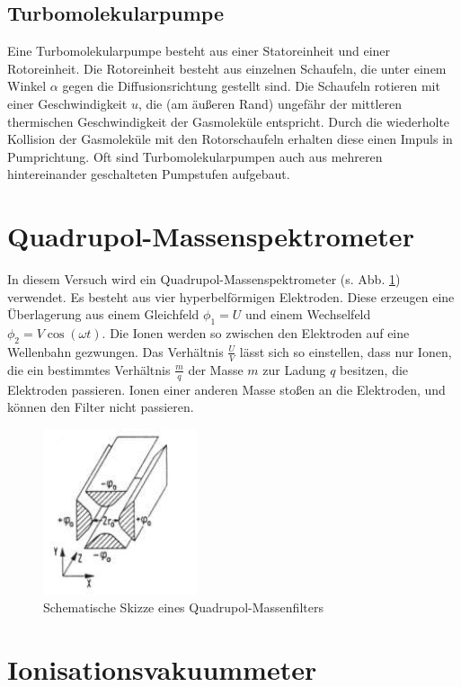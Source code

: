 \subsection{Turbomolekularpumpe}

Eine Turbomolekularpumpe besteht aus einer Statoreinheit und einer Rotoreinheit. Die Rotoreinheit besteht aus einzelnen Schaufeln, die unter einem Winkel $\alpha$ gegen die Diffusionsrichtung gestellt sind.
Die Schaufeln rotieren mit einer Geschwindigkeit $u$, die (am äußeren Rand) ungefähr der mittleren thermischen Geschwindigkeit der Gasmoleküle entspricht. Durch die wiederholte Kollision der Gasmoleküle mit den Rotorschaufeln erhalten diese einen Impuls in Pumprichtung.
Oft sind Turbomolekularpumpen auch aus mehreren hintereinander geschalteten Pumpstufen aufgebaut.

\section{Quadrupol-Massenspektrometer}

In diesem Versuch wird ein Quadrupol-Massenspektrometer (s. Abb. \ref{fig021}) verwendet. Es besteht aus vier hyperbelförmigen Elektroden. Diese erzeugen eine Überlagerung aus einem Gleichfeld $\phi_{1}=U$ und einem Wechselfeld $\phi_{2}=V\cos(\omega t)$.
Die Ionen werden so zwischen den Elektroden auf eine Wellenbahn gezwungen. Das Verhältnis $\frac{U}{V}$ lässt sich so einstellen, dass nur Ionen, die ein bestimmtes Verhältnis $\frac{m}{q}$ der Masse $m$ zur Ladung $q$ besitzen, die Elektroden passieren. Ionen einer anderen Masse stoßen an die Elektroden, und können den Filter nicht passieren.

\begin{figure}[tb]
 \centering
 \includegraphics[scale=0.9]{./fig/massenspek_quadrupol.png}
 \caption{Schematische Skizze eines Quadrupol-Massenfilters}
 \label{fig021}
\end{figure}

\section{Ionisationsvakuummeter}

